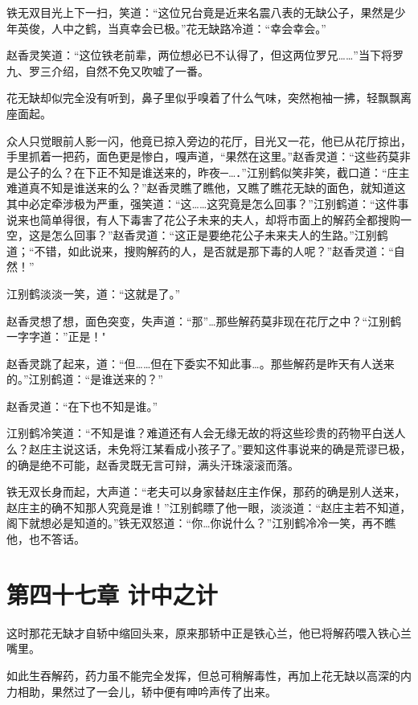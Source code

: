 \documentclass[12pt,oneside]{book}
\begin{document}
铁无双目光上下一扫，笑道：``这位兄台竟是近来名震八表的无缺公子，果然是少年英俊，人中之鹤，当真幸会已极。''花无缺路冷道：``幸会幸会。''

赵香灵笑道：``这位铁老前辈，两位想必已不认得了，但这两位罗兄\ldots\ldots{}''当下将罗九、罗三介绍，自然不免又吹嘘了一番。

花无缺却似完全没有听到，鼻子里似乎嗅着了什么气味，突然袍袖一拂，轻飘飘离座面起。

众人只觉眼前人影一闪，他竟已掠入旁边的花厅，目光又一花，他已从花厅掠出，手里抓着一把药，面色更是惨白，嘎声道，``果然在这里。''赵香灵道：``这些药莫非是公子的么？在下正不知是谁送来的，昨夜─\ldots．''江别鹤似笑非笑，截口道：``庄主难道真不知是谁送来的么？''赵香灵瞧了瞧他，又瞧了瞧花无缺的面色，就知道这其中必定牵涉极为严重，强笑道：``这\ldots\ldots 这究竟是怎么回事？''江别鹤道：``这件事说来也简单得很，有人下毒害了花公子未来的夫人，却将市面上的解药全都搜购一空，这是怎么回事？''赵香灵道：``这正是要绝花公子未来夫人的生路。''江别鹤道；``不错，如此说来，搜购解药的人，是否就是那下毒的人呢？''赵香灵道：``自然！''

江别鹤淡淡一笑，道：``这就是了。''

赵香灵想了想，面色突变，失声道：``那''\ldots 那些解药莫非现在花厅之中？``江别鹤一字字道：''正是！"

赵香灵跳了起来，道：``但\ldots\ldots 但在下委实不知此事\ldots。那些解药是昨天有人送来的。''江别鹤道：``是谁送来的？''

赵香灵道：``在下也不知是谁。''

江别鹤冷笑道：``不知是谁？难道还有人会无缘无故的将这些珍贵的药物平白送人么？赵庄主说这话，未免将江某看成小孩子了。''要知这件事说来的确是荒谬已极，的确是绝不可能，赵香灵既无言可辩，满头汗珠滚滚而落。

铁无双长身而起，大声道：``老夫可以身家替赵庄主作保，那药的确是别人送来，赵庄主的确不知那人究竟是谁！''江别鹤瞟了他一眼，淡淡道：``赵庄主若不知道，阁下就想必是知道的。''铁无双怒道：``你\ldots 你说什么？''江别鹤冷冷一笑，再不瞧他，也不答话。

\hypertarget{ux7b2cux56dbux5341ux4e03ux7ae0-ux8ba1ux4e2dux4e4bux8ba1}{%
\chapter{第四十七章
计中之计}\label{ux7b2cux56dbux5341ux4e03ux7ae0-ux8ba1ux4e2dux4e4bux8ba1}}

这时那花无缺才自轿中缩回头来，原来那轿中正是铁心兰，他已将解药喂入铁心兰嘴里。

如此生吞解药，药力虽不能完全发挥，但总可稍解毒性，再加上花无缺以高深的内力相助，果然过了一会儿，轿中便有呻吟声传了出来。
\end{document}

